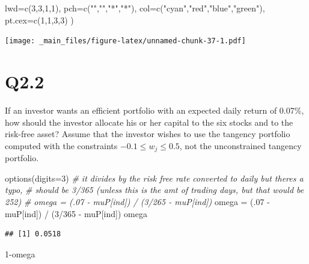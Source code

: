 \documentclass[
  oneside]{book}
\newenvironment{Shaded}{\begin{snugshade}}{\end{snugshade}}
\newcommand{\AttributeTok}[1]{\textcolor[rgb]{0.77,0.63,0.00}{#1}}
\newcommand{\CommentTok}[1]{\textcolor[rgb]{0.56,0.35,0.01}{\textit{#1}}}
\newcommand{\DecValTok}[1]{\textcolor[rgb]{0.00,0.00,0.81}{#1}}
\newcommand{\FunctionTok}[1]{\textcolor[rgb]{0.00,0.00,0.00}{#1}}
\newcommand{\NormalTok}[1]{#1}
\newcommand{\OtherTok}[1]{\textcolor[rgb]{0.56,0.35,0.01}{#1}}
\newcommand{\SpecialCharTok}[1]{\textcolor[rgb]{0.00,0.00,0.00}{#1}}
\newcommand{\StringTok}[1]{\textcolor[rgb]{0.31,0.60,0.02}{#1}}
\begin{document}
\begin{Shaded}
\begin{Highlighting}[]
       \AttributeTok{lwd=}\FunctionTok{c}\NormalTok{(}\DecValTok{3}\NormalTok{,}\DecValTok{3}\NormalTok{,}\DecValTok{1}\NormalTok{,}\DecValTok{1}\NormalTok{),}
       \AttributeTok{pch=}\FunctionTok{c}\NormalTok{(}\StringTok{""}\NormalTok{,}\StringTok{""}\NormalTok{,}\StringTok{"*"}\NormalTok{,}\StringTok{"*"}\NormalTok{),}
       \AttributeTok{col=}\FunctionTok{c}\NormalTok{(}\StringTok{"cyan"}\NormalTok{,}\StringTok{"red"}\NormalTok{,}\StringTok{"blue"}\NormalTok{,}\StringTok{"green"}\NormalTok{),}
       \AttributeTok{pt.cex=}\FunctionTok{c}\NormalTok{(}\DecValTok{1}\NormalTok{,}\DecValTok{1}\NormalTok{,}\DecValTok{3}\NormalTok{,}\DecValTok{3}\NormalTok{)}
\NormalTok{)}
\end{Highlighting}
\end{Shaded}

\texttt{[image: \_main\_files/figure-latex/unnamed-chunk-37-1.pdf]}

\hypertarget{q2.2}{%
\section{Q2.2}\label{q2.2}}

If an investor wants an efficient portfolio with an expected daily return of 0.07\%, how should the investor allocate his or her capital to the six stocks and to the risk-free asset? Assume that the investor wishes to use the tangency portfolio computed with the constraints \(−0.1 \leq w_j \leq 0.5\), not the unconstrained tangency portfolio.

\begin{Shaded}
\begin{Highlighting}[]
\FunctionTok{options}\NormalTok{(}\AttributeTok{digits=}\DecValTok{3}\NormalTok{)}
\CommentTok{\# it divides by the risk free rate converted to daily but theres a typo,}
\CommentTok{\# should be 3/365 (unless this is the amt of trading days, but that would be 252)}
\CommentTok{\# omega = (.07 {-} muP[ind]) / (3/265 {-} muP[ind])}
\NormalTok{omega }\OtherTok{=}\NormalTok{ (.}\DecValTok{07} \SpecialCharTok{{-}}\NormalTok{ muP[ind]) }\SpecialCharTok{/}\NormalTok{ (}\DecValTok{3}\SpecialCharTok{/}\DecValTok{365} \SpecialCharTok{{-}}\NormalTok{ muP[ind])}
\NormalTok{omega}
\end{Highlighting}
\end{Shaded}

\begin{verbatim}
## [1] 0.0518
\end{verbatim}

\begin{Shaded}
\begin{Highlighting}[]
\DecValTok{1}\SpecialCharTok{{-}}\NormalTok{omega}
\end{Highlighting}
\end{Shaded}
\end{document}
